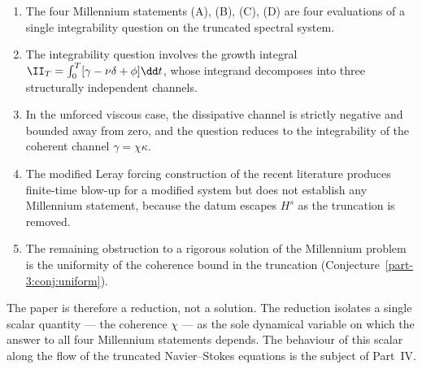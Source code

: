 \begin{enumerate}[label=(\arabic*),leftmargin=*]
\item The four Millennium statements (A), (B), (C), (D) are four 
      evaluations of a single integrability question on the truncated 
      spectral system.

\item The integrability question involves the growth integral 
      $\II_T = \int_0^T[\gamma - \nu\delta + \phi]\dd t$, whose 
      integrand decomposes into three structurally independent 
      channels.

\item In the unforced viscous case, the dissipative channel is 
      strictly negative and bounded away from zero, and the question 
      reduces to the integrability of the coherent channel 
      $\gamma = \chi\kappa$.

\item The modified Leray forcing construction of the recent 
      literature produces finite-time blow-up for a modified system 
      but does not establish any Millennium statement, because the 
      datum escapes $H^s$ as the truncation is removed.

\item The remaining obstruction to a rigorous solution of the 
      Millennium problem is the uniformity of the coherence bound 
      in the truncation (Conjecture~\ref{part-3:conj:uniform}).
\end{enumerate}

The paper is therefore a reduction, not a solution. The reduction 
isolates a single scalar quantity --- the coherence $\chi$ --- as 
the sole dynamical variable on which the answer to all four 
Millennium statements depends. The behaviour of this scalar along 
the flow of the truncated Navier--Stokes equations is the subject of 
Part~IV.

